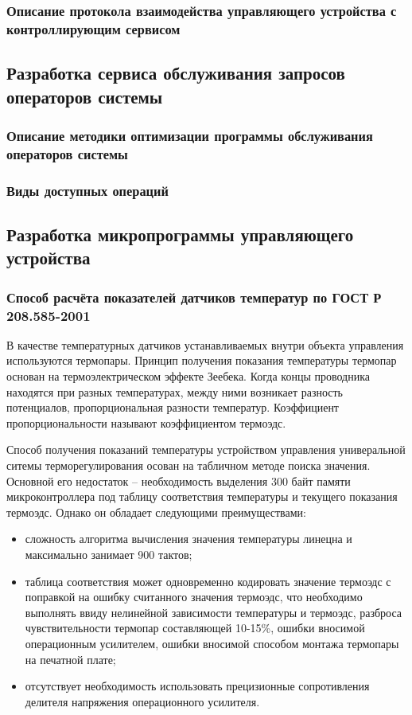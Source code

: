 \subsubsection{Описание протокола взаимодейства управляющего устройства с
контроллирующим сервисом}

\subsection{Разработка сервиса обслуживания запросов операторов системы}
\subsubsection{Описание методики оптимизации программы обслуживания операторов
системы}
\subsubsection{Виды доступных операций}

\subsection{Разработка микропрограммы управляющего устройства}

\subsubsection{Способ расчёта показателей датчиков температур по
ГОСТ Р 208.585-2001}
В качестве температурных датчиков устанавливаемых внутри объекта управления используются
термопары. Принцип получения показания температуры термопар основан на
термоэлектрическом эффекте Зеебека. Когда концы проводника находятся при разных температурах,
между ними возникает разность потенциалов, пропорциональная разности температур.
Коэффициент пропорциональности называют коэффициентом термоэдс.

Способ получения показаний температуры устройством управления универальной
ситемы терморегулирования осован на табличном методе поиска значения.
Основной его недостаток -- необходимость выделения 300 байт памяти микроконтроллера под
таблицу соответствия температуры и текущего показания термоэдс.
Однако он обладает следующими преимуществами:
\begin{itemize}
	\item{} сложность алгоритма вычисления значения температуры линецна и максимально занимает
		900 тактов;
	\item{} таблица соответствия может одновременно кодировать значение термоэдс с поправкой на
		ошибку считанного значения термоэдс, что необходимо выполнять ввиду нелинейной зависимости
		температуры и термоэдс, разброса чувствительности термопар составляющей 10-15\%, ошибки
		вносимой операционным усилителем, ошибки вносимой способом монтажа термопары на печатной плате;
	\item{} отсутствует необходимость использовать прецизионные сопротивления делителя
		напряжения операционного усилителя.
\end{itemize}

